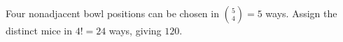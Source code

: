 Four nonadjacent bowl positions can be chosen in $\binom54=5$ ways. Assign the distinct mice in $4!=24$ ways, giving $\boxed{120}$.
